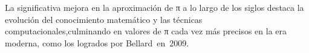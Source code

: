 \documentclass[preview]{standalone}
\begin{document}
\begin{center}
La significativa mejora en la aproximación de π a lo largo de los siglos destaca la evolución del conocimiento matemático y las técnicas computacionales,\n culminando en valores de π cada vez más precisos en la era moderna, como los logrados por Bellard en 2009.
\end{center}
\end{document}
